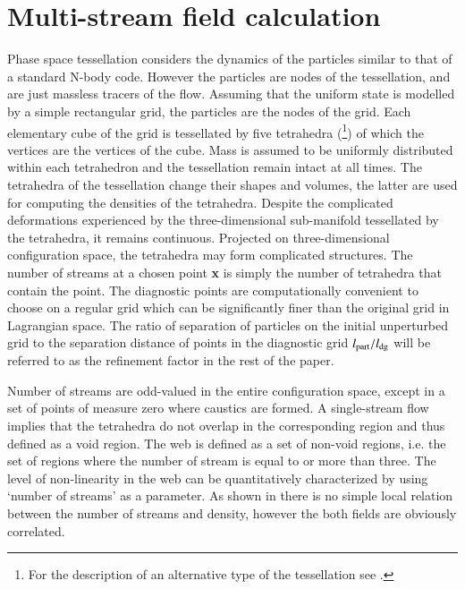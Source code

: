 \section{Multi-stream field calculation}
\label{subsec:method}

Phase space tessellation considers the dynamics of the particles similar to that of a standard N-body code. 
However the particles are nodes of the tessellation, and are just massless tracers of the flow.
Assuming that the uniform state is modelled by a simple rectangular grid, the particles are the nodes of the grid.
Each elementary cube of the grid is tessellated by five tetrahedra (\citealt{Shandarin2012}\footnote{For the description of an alternative type of the tessellation see \citet{Abel2012}.}) of which the vertices are the
vertices of the cube. Mass is assumed to be uniformly distributed within each tetrahedron and the tessellation remain
intact at all times. The tetrahedra of the tessellation change their shapes and volumes, the latter are used for
computing the densities of the tetrahedra. Despite the complicated deformations experienced by the three-dimensional
sub-manifold tessellated by the tetrahedra, it remains continuous. Projected on three-dimensional configuration space, the tetrahedra
may form complicated structures. The number of streams at a chosen point {\bf x} is simply the number of tetrahedra that contain the point. The diagnostic points are computationally convenient to choose on a regular grid which can be significantly finer than the original grid in Lagrangian space. The ratio of separation of particles on the initial unperturbed grid to the separation distance of points in the diagnostic grid  $l_{\rm part}/l_{\rm dg} $ will be referred to as the refinement factor in the rest of the paper.

Number of streams are odd-valued in the entire configuration space, except in a set of points of measure zero where caustics are formed.  
 A single-stream flow implies that the tetrahedra do not overlap in the corresponding region and thus defined as a void region.
 The web is defined as a set of non-void regions, i.e. the set of regions where the number of stream is equal to or more than three.
 The level of non-linearity in the web  can be quantitatively characterized by using `number of streams' as a parameter. As shown in  \citep{Shandarin2012} there is no simple local relation between the number of streams and density, however the both
 fields are obviously correlated.

